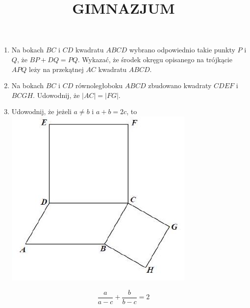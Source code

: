 \documentclass[10pt]{article}
\title{GIMNAZJUM }
\author{}
\date{}
\begin{document}
\maketitle
\begin{enumerate}
  \item Na bokach \(B C\) i \(C D\) kwadratu \(A B C D\) wybrano odpowiednio takie punkty \(P\) i \(Q\), że \(B P+D Q=P Q\). Wykazać, że środek okręgu opisanego na trójkącie \(A P Q\) leży na przekątnej \(A C\) kwadratu \(A B C D\).
  \item Na bokach \(B C\) i \(C D\) równoległoboku \(A B C D\) zbudowano kwadraty \(C D E F\) i \(B C G H\). Udowodnij, że \(|A C|=|F G|\).
  \item Udowodnij, że jeżeli \(a \neq b\) i \(a+b=2 c\), to\\
\includegraphics[max width=\textwidth, center]{2024_11_21_f2eb1b7285ec9169cbc0g-1}
\end{enumerate}

\[
\frac{a}{a-c}+\frac{b}{b-c}=2
\]
\end{document}
